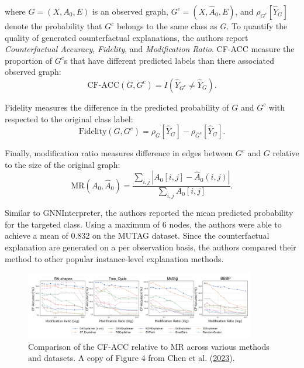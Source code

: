 \documentclass[
  11pt,
  letterpaper,
]{article}
\begin{document}
where \(G = (X, A_0, E)\) is an observed graph,
\(G^c = (X, \hat A_0, E)\), and \(\rho_{G^c}[\hat Y_{G}]\) denote the
probability that \(G^c\) belongs to the same class as \(G\). To quantify
the quality of generated counterfactual explanations, the authors report
\emph{Counterfactual Accuracy}, \emph{Fidelity}, and \emph{Modification
Ratio}. CF-ACC measure the proportion of \(G^c\)s that have different
predicted labels than there associated observed graph: \begin{equation}
        \text{CF-ACC}(G, G^c) = I(\hat Y_{G^c} \neq \hat Y_{G}).
\end{equation}

Fidelity measures the difference in the predicted probability of \(G\)
and \(G^c\) with respected to the original class label: \begin{equation}
    \text{Fidelity}(G, G^c) = \rho_{G}[\hat Y_G] - \rho_{G^c}[\hat Y_G].
\end{equation}

Finally, modification ratio measures difference in edges between \(G^c\)
and \(G\) relative to the size of the original graph:
\begin{equation} \label{mod-ratio}
    \text{MR}(A_0, \hat A_0) = \dfrac{\sum_{i, j} |A_0[i, j] - \hat A_0(i, j)|}{\sum_{i, j} A_0[i, j]}. 
\end{equation}

\quad Similar to GNNInterpreter, the authors reported the mean predicted
probability for the targeted class. Using a maximum of 6 nodes, the
authors were able to achieve a mean of 0.832 on the MUTAG dataset. Since
the counterfactual explanation are generated on a per observation basis,
the authors compared their method to other popular instance-level
explanation methods.

\begin{figure}

{\centering \includegraphics[width=0.9\textwidth,height=\textheight]{figures/D4-CF-Plot.png}

}

\caption{\label{fig-D4-CF-ACC}Comparison of the CF-ACC relative to MR
across various methods and datasets. A copy of Figure 4 from Chen et al.
(\protect\hyperlink{ref-Chen_Wu_Gupta_Ying_2023}{2023}).}

\end{figure}
\end{document}

